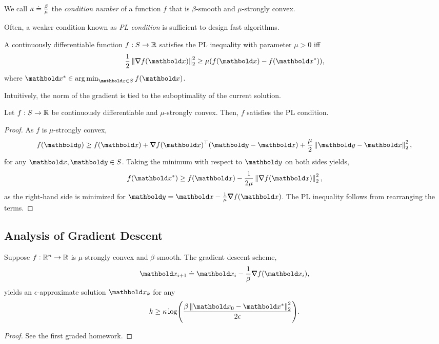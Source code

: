 \begin{defn} We call $\kappa \overset{.}{=} \frac{\beta}{\mu}$ the \emph{condition number} of a function $f$ that is $\beta$-smooth and $\mu$-strongly convex.
\end{defn}

Often, a weaker condition known as \emph{PL condition} is sufficient to design fast algorithms.

\begin{defn} A continuously differentiable function $f: S \to \mathbb{R}$ satisfies the PL inequality with parameter $\mu > 0$ iff \begin{align}
    \frac{1}{2}\norm{\grad f(\vx)}_2^2 \geq \mu (f(\vx) - f(\s{\vx})),
\end{align} where $\s{\vx} \in \argmin_{\vx \in \sS} f(\vx)$.
\end{defn}\noindent Intuitively, the norm of the gradient is tied to the suboptimality of the current solution.

\begin{lem}
Let $f: S \to \mathbb{R}$ be continuously differentiable and $\mu$-strongly convex. Then, $f$ satisfies the PL condition.
\end{lem}
\begin{proof}
As $f$ is $\mu$-strongly convex, \begin{align*}
    f(\vy) \geq f(\vx) + \trans{\grad f(\vx)}(\vy - \vx) + \frac{\mu}{2}\norm{\vy - \vx}_2^2,
\end{align*} for any $\vx, \vy \in \sS$. Taking the minimum with respect to $\vy$ on both sides yields, \begin{align*}
    f(\s{\vx}) \geq f(\vx) - \frac{1}{2\mu}\norm{\grad f(\vx)}_2^2,
\end{align*} as the right-hand side is minimized for $\vy = \vx - \frac{1}{\mu}\grad f(\vx)$. The PL inequality follows from rearranging the terms.
\end{proof}

\subsection{Analysis of Gradient Descent}

\begin{thm} Suppose $f: \mathbb{R}^n \to \mathbb{R}$ is $\mu$-strongly convex and $\beta$-smooth. The gradient descent scheme, \begin{align}
    \vx_{i+1} \defeq \vx_i - \frac{1}{\beta}\grad f(\vx_i),
\end{align} yields an $\epsilon$-approximate solution $\vx_k$ for any \begin{align*}
    k \geq \kappa\log\parentheses*{\frac{\beta\norm{\vx_0 - \s{\vx}}_2^2}{2\epsilon}}.
\end{align*}
\end{thm}
\begin{proof}
See the first graded homework.
\end{proof}

